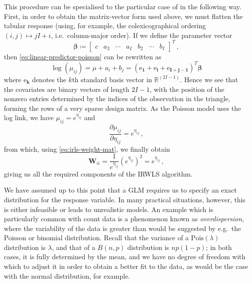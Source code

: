 \documentclass[a4paper]{book}
\begin{document}
This procedure can be specialised to the particular case of  in the following way. First, in order to obtain the matrix-vector form used above, we must flatten the tabular response (using, for example, the colexicographical ordering $(i, j) \mapsto j I + i$, i.e.\ column-major order). If we define the parameter vector
\begin{equation}
  \bm{\beta} \coloneqq \begin{bmatrix} c & a_2 & \cdots & a_I & b_2 & \cdots & b_I \end{bmatrix}^T \,,
\end{equation}
then \cref{eq:linear-predictor-poisson} can be rewritten as
\begin{equation}
  \log(\mu_{ij}) = \mu + a_i + b_j = (\bm{\mathrm{e}_1} + \bm{\mathrm{e}_i} + \bm{\mathrm{e}_{I + j - 1}})^T \bm{\beta}
\end{equation}
where $\bm{\mathrm{e}_k}$ denotes the $k$th standard basis vector in $\mathbb{R}^{(2I - 1)}$. Hence we see that the covariates are binary vectors of length $2I - 1$, with the position of the nonzero entries determined by the indices of the observation in the triangle, forming the rows of a very sparse design matrix. As the Poisson model uses the log link, we have $\mu_{ij} = e^{\eta_{ij}}$ and
\begin{equation}
  \frac{\partial \mu_{ij}}{\partial \eta_{ij}} = e^{\eta_{ij}} \,,
\end{equation}
from which, using \cref{eq:irls-weight-mat}, we finally obtain
\begin{equation}
  \mathbf{W}_{ii} = \frac{1}{e^{\eta_{ij}}} (e^{\eta_{ij}})^2 = e^{\eta_{ij}} \,,
\end{equation}
giving us all the required components of the IRWLS algorithm.

We have assumed up to this point that a GLM requires us to specify an exact distribution for the response variable. In many practical situations, however, this is either infeasible or leads to unrealistic models. An example which is particularly common with count data is a phenomenon known as \emph{overdispersion}, where the variability of the data is greater than would be suggested by e.g.\ the Poisson or binomial distribution. Recall that the variance of a $\mathrm{Pois}(\lambda)$ distribution is $\lambda$, and that of a $B(n, p)$ distribution is $np(1 - p)$; in both cases, it is fully determined by the mean, and we have no degree of freedom with which to adjust it in order to obtain a better fit to the data, as would be the case with the normal distribution, for example.
\end{document}

